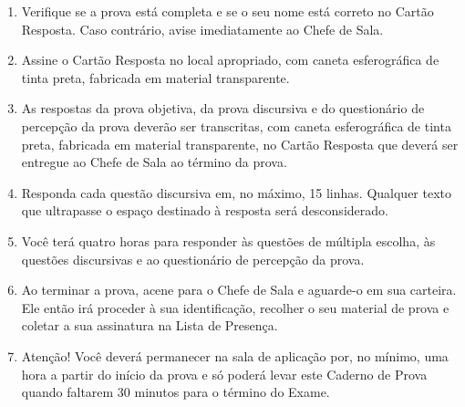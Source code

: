 \documentclass{exam}
\begin{document}
\begin{enumerate}
    \item  Verifique se a prova está completa e se o seu nome está correto no Cartão Resposta. Caso contrário, avise imediatamente ao Chefe de Sala.
    \item Assine o Cartão Resposta no local apropriado, com caneta esferográfica de tinta preta, fabricada em material transparente.
    \item As respostas da prova objetiva, da prova discursiva e do questionário de percepção da prova deverão ser transcritas, com caneta esferográfica de tinta preta, fabricada em material transparente, no Cartão Resposta que deverá ser entregue ao Chefe de Sala ao término da prova.
    \item Responda cada questão discursiva em, no máximo, 15 linhas. Qualquer texto que ultrapasse o espaço destinado à resposta será desconsiderado.
    \item Você terá quatro horas para responder às questões de múltipla escolha, às questões discursivas e ao    questionário de percepção da prova.
    \item  Ao terminar a prova, acene para o Chefe de Sala e aguarde-o em sua carteira. Ele então irá proceder à sua identificação, recolher o seu material de prova e coletar a sua assinatura na Lista de Presença.
    \item Atenção! Você deverá permanecer na sala de aplicação por, no mínimo, uma hora a partir do início da prova e só poderá levar este Caderno de Prova quando faltarem 30 minutos para o término do Exame.

\end{enumerate}
\end{document}

